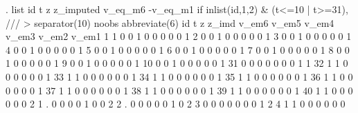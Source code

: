 . list id t z z_imputed v_eq_m6 -v_eq_m1 if inlist(id,1,2) \& (t<=10 | t>=31), ///
> separator(10) noobs abbreviate(6)
{\smallskip}
  {\TLC}
  {\VBAR} id    t   z   z_im{\tytilde}d   v_e{\tytilde}m6   v_e{\tytilde}m5   v_e{\tytilde}m4   v_e{\tytilde}m3   v_e{\tytilde}m2   v_e{\tytilde}m1 {\VBAR}
  {\LFTT}
  {\VBAR}  1    1   0        0        1        0        0        0        0        0 {\VBAR}
  {\VBAR}  1    2   0        0        1        0        0        0        0        0 {\VBAR}
  {\VBAR}  1    3   0        0        1        0        0        0        0        0 {\VBAR}
  {\VBAR}  1    4   0        0        1        0        0        0        0        0 {\VBAR}
  {\VBAR}  1    5   0        0        1        0        0        0        0        0 {\VBAR}
  {\VBAR}  1    6   0        0        1        0        0        0        0        0 {\VBAR}
  {\VBAR}  1    7   0        0        1        0        0        0        0        0 {\VBAR}
  {\VBAR}  1    8   0        0        1        0        0        0        0        0 {\VBAR}
  {\VBAR}  1    9   0        0        1        0        0        0        0        0 {\VBAR}
  {\VBAR}  1   10   0        0        1        0        0        0        0        0 {\VBAR}
  {\LFTT}
  {\VBAR}  1   31   0        0        0        0        0        0        0        1 {\VBAR}
  {\VBAR}  1   32   1        1        0        0        0        0        0        0 {\VBAR}
  {\VBAR}  1   33   1        1        0        0        0        0        0        0 {\VBAR}
  {\VBAR}  1   34   1        1        0        0        0        0        0        0 {\VBAR}
  {\VBAR}  1   35   1        1        0        0        0        0        0        0 {\VBAR}
  {\VBAR}  1   36   1        1        0        0        0        0        0        0 {\VBAR}
  {\VBAR}  1   37   1        1        0        0        0        0        0        0 {\VBAR}
  {\VBAR}  1   38   1        1        0        0        0        0        0        0 {\VBAR}
  {\VBAR}  1   39   1        1        0        0        0        0        0        0 {\VBAR}
  {\VBAR}  1   40   1        1        0        0        0        0        0        0 {\VBAR}
  {\LFTT}
  {\VBAR}  2    1   .        0        0        0        0        1        0        0 {\VBAR}
  {\VBAR}  2    2   .        0        0        0        0        0        1        0 {\VBAR}
  {\VBAR}  2    3   0        0        0        0        0        0        0        1 {\VBAR}
  {\VBAR}  2    4   1        1        0        0        0        0        0        0 {\VBAR}
